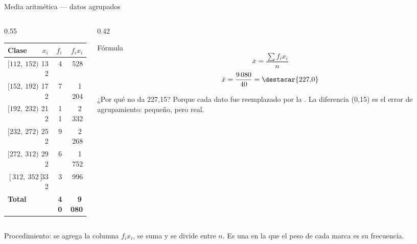 \documentclass[aspectratio=169,10pt]{beamer}
\begin{document}
\begin{frame}{Media aritmética — datos agrupados}
  \scriptsize
  \begin{columns}[T,onlytextwidth]
    \begin{column}{0.55\textwidth}
      \centering
      \begin{tabular}{@{}lrrr@{}}
        \toprule
        \textbf{Clase} & \textbf{$x_i$} & \textbf{$f_i$} & \textbf{$f_i x_i$} \\
        \midrule
        $[112,\ 152)$ & 132 &  4 &   528 \\
        $[152,\ 192)$ & 172 &  7 & 1\,204 \\
        $[192,\ 232)$ & 212 & 11 & 2\,332 \\
        $[232,\ 272)$ & 252 &  9 & 2\,268 \\
        $[272,\ 312)$ & 292 &  6 & 1\,752 \\
        $[312,\ 352]$ & 332 &  3 &   996 \\
        \midrule
        \textbf{Total} & & \textbf{40} & \textbf{9\,080} \\
        \bottomrule
      \end{tabular}
    \end{column}
    \begin{column}{0.42\textwidth}
      \begin{block}{Fórmula}
        \scriptsize
        \[ \bar{x} = \frac{\sum f_i x_i}{n} \]
        \[ \bar{x} = \frac{9\,080}{40} = \destacar{227{,}0} \]
      \end{block}
      \begin{alertblock}{¿Por qué no da 227,15?}
        \tiny
        Porque cada dato fue reemplazado por la . La
        diferencia (0,15) es el error de agrupamiento: pequeño, pero real.
      \end{alertblock}
    \end{column}
  \end{columns}

  \vspace{0.05cm}
  {\tiny\color{uniGris} Procedimiento: se agrega la columna $f_i x_i$, se suma
  y se divide entre $n$. Es una  en la que el peso de
  cada marca es su frecuencia.}
\end{frame}
\end{document}
